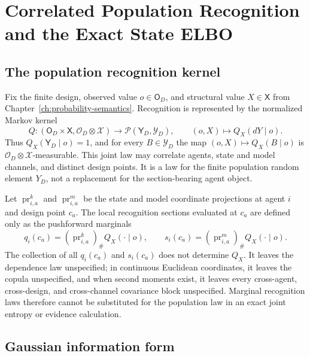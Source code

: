 \chapter{Correlated Population Recognition and the Exact State ELBO}
\label{ch:structured-recognition-elbo}

\section{The population recognition kernel}

Fix the finite design, observed value \(o\in\mathsf O_D\), and structural value \(X\in\mathsf X\) from Chapter~\ref{ch:probability-semantics}. Recognition is represented by the normalized Markov kernel
\begin{equation}
Q:(\mathsf O_D\times\mathsf X,
\mathscr O_D\otimes\mathscr X)
\longrightarrow\mathcal P(\mathsf Y_D,\mathscr Y_D),
\qquad
(o,X)\longmapsto Q_X(dY\mid o).
\label{eq:structured-recognition-kernel}
\end{equation}
Thus \(Q_X(\mathsf Y_D\mid o)=1\), and for every \(B\in\mathscr Y_D\) the map \((o,X)\mapsto Q_X(B\mid o)\) is \(\mathscr O_D\otimes\mathscr X\)-measurable. This joint law may correlate agents, state and model channels, and distinct design points. It is a law for the finite population random element \(Y_D\), not a replacement for the section-bearing agent object.

Let \(\operatorname{pr}_{i,a}^{k}\) and \(\operatorname{pr}_{i,a}^{m}\) be the state and model coordinate projections at agent \(i\) and design point \(c_a\). The local recognition sections evaluated at \(c_a\) are defined only as the pushforward marginals
\begin{equation}
q_i(c_a)
=\left(\operatorname{pr}_{i,a}^{k}\right)_{\#}
Q_X(\mathord\cdot\mid o),
\qquad
s_i(c_a)
=\left(\operatorname{pr}_{i,a}^{m}\right)_{\#}
Q_X(\mathord\cdot\mid o).
\label{eq:structured-recognition-pushforwards}
\end{equation}
The collection of all \(q_i(c_a)\) and \(s_i(c_a)\) does not determine \(Q_X\). It leaves the dependence law unspecified; in continuous Euclidean coordinates, it leaves the copula unspecified, and when second moments exist, it leaves every cross-agent, cross-design, and cross-channel covariance block unspecified. Marginal recognition laws therefore cannot be substituted for the population law in an exact joint entropy or evidence calculation.

\section{Gaussian information form}

